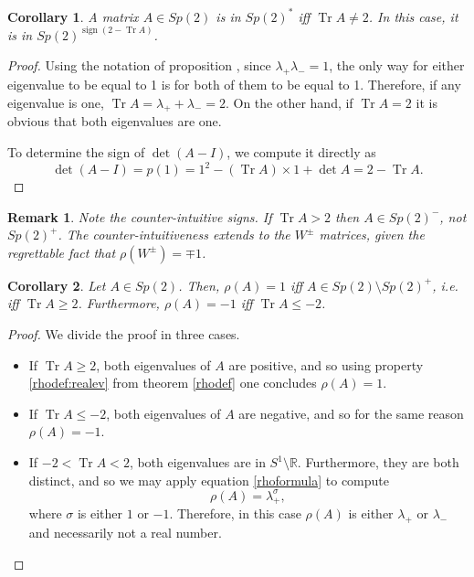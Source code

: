 \documentclass{article}
\newtheorem{corollary}{Corollary}
\newtheorem{remark}{Remark}
\theoremstyle{nonumberplain}
\newtheorem{proof}{Proof}
\newcommand{\R}{\mathbb{R}}
\DeclareMathOperator{\sign}{sign}
\DeclareMathOperator{\trace}{Tr}
\begin{document}
\begin{corollary}
A matrix $A \in Sp(2)$ is in $Sp(2)^*$ iff $\trace A \neq 2$. In this case, it is in $Sp(2)^{\sign(2 - \trace A)}$.
\end{corollary}

\begin{proof}
Using the notation of proposition \label{lambdafromtau}, since $\lambda_+ \lambda_- = 1$, the only way for either eigenvalue to be equal to 1 is for both of them to be equal to 1. Therefore, if any eigenvalue is one, $\trace A = \lambda_+ + \lambda_- = 2$. On the other hand, if $\trace A = 2$ it is obvious that both eigenvalues are one.

To determine the sign of $\det(A-I)$, we compute it directly as
\begin{equation}
\det(A-I) = p(1) = 1^2 - (\trace A) \times 1 + \det A = 2 - \trace A.
\end{equation}
\end{proof}

\begin{remark}
Note the counter-intuitive signs. If $\trace A > 2$ then $A \in Sp(2)^-$, not $Sp(2)^+$. The counter-intuitiveness extends to the $W^\pm$ matrices, given the regrettable fact that $\rho(W^\pm) = \mp 1$.
\end{remark}

\begin{corollary}\label{sp2pm}
Let $A \in Sp(2)$. Then, $\rho(A) = 1$ iff $A \in Sp(2) \setminus Sp(2)^+$, i.e. iff $\trace A \geq 2$. Furthermore, $\rho(A) = -1$ iff $\trace A \leq -2$.
\end{corollary}

\begin{proof}
We divide the proof in three cases.
\begin{itemize}
\item If $\trace A \geq 2$, both eigenvalues of $A$ are positive, and so using property \ref{rhodef:realev} from theorem \ref{rhodef} one concludes $\rho(A) = 1$.
\item If $\trace A \leq -2$, both eigenvalues of $A$ are negative, and so for the same reason $\rho(A) = -1$.
\item If $-2 < \trace A < 2$, both eigenvalues are in $S^1 \setminus \R$. Furthermore, they are both distinct, and so we may apply equation \eqref{rhoformula} to compute
\begin{equation}\label{sp2pm:3}
\rho(A) = \lambda_+^\sigma,
\end{equation}
where $\sigma$ is either $1$ or $-1$. Therefore, in this case $\rho(A)$ is either $\lambda_+$ or $\lambda_-$ and necessarily not a real number.
\end{itemize}
\end{proof}
\end{document}
